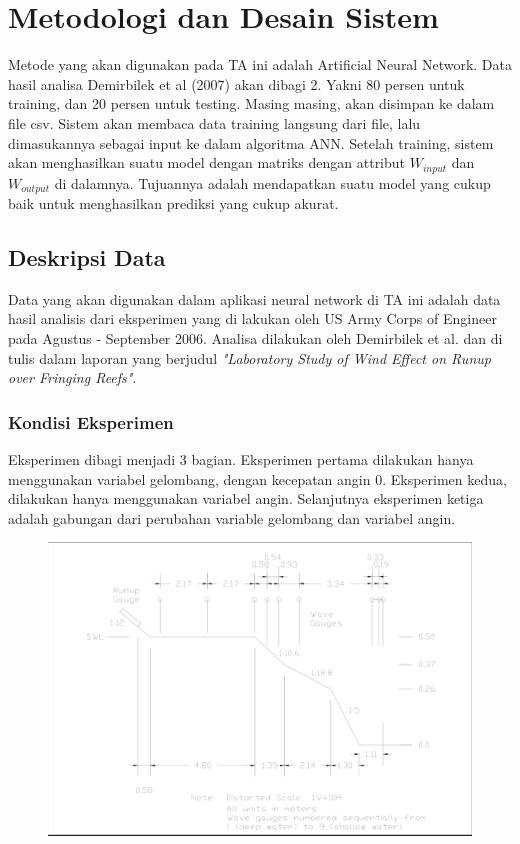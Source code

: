 \chapter{Metodologi dan Desain Sistem}
Metode yang akan digunakan pada TA ini adalah Artificial Neural Network. Data hasil analisa Demirbilek et al (2007) \cite{DemirbilekReport} akan dibagi 2. Yakni 80 persen untuk training, dan 20 persen untuk testing. Masing masing, akan disimpan ke dalam file csv. Sistem akan membaca data training langsung dari file, lalu dimasukannya sebagai input ke dalam algoritma ANN. Setelah training, sistem akan menghasilkan suatu model dengan matriks dengan attribut $W_{input}$ dan $W_{output}$ di dalamnya. Tujuannya adalah mendapatkan suatu model yang cukup baik untuk menghasilkan prediksi yang cukup akurat.

\section{Deskripsi Data}
Data yang akan digunakan dalam aplikasi neural network di TA ini adalah data hasil analisis dari eksperimen yang di lakukan oleh US Army Corps of Engineer pada Agustus - September 2006. Analisa dilakukan oleh Demirbilek et al. dan di tulis dalam laporan yang berjudul \emph{"Laboratory Study of Wind Effect on Runup over Fringing Reefs"}.

\subsection{Kondisi Eksperimen}
\label{kondisiEksperimen}

Eksperimen dibagi menjadi 3 bagian. Eksperimen pertama dilakukan hanya menggunakan variabel gelombang, dengan kecepatan angin 0. Eksperimen kedua, dilakukan hanya menggunakan variabel angin. Selanjutnya eksperimen ketiga adalah gabungan dari perubahan variable gelombang dan variabel angin.

\begin{figure}
  \begin{center}
    \includegraphics[scale=0.2]{./images/instrumen_eksperimen.png}
  \end{center}
  \caption{}
\end{figure}
\FloatBarrier

